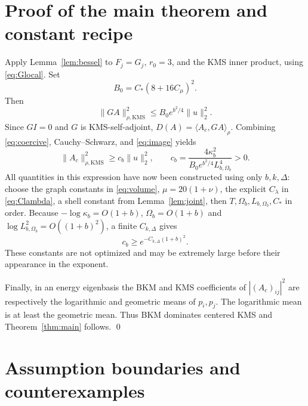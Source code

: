 \documentclass[11pt]{article}
\theoremstyle{remark}\newtheorem{remark}[theorem]{Remark}
\newcommand{\ip}[2]{\langle #1,#2\rangle_\rho}
\newcommand{\kn}[1]{\|#1\|_{\rho,\mathrm{KMS}}}
\begin{document}
\section{Proof of the main theorem and constant recipe}\label{sec:constants}
Apply Lemma~\ref{lem:bessel} to $F_j=G_j$, $r_0=3$, and the KMS inner product, using \eqref{eq:Glocal}. Set
\[
 B_0=C_*(8+16C_\mu)^2.
\]
Then
\begin{equation}\label{eq:image}
 \kn{GA}^2\le B_0e^{b^2/4}\|u\|_2^2.
\end{equation}
Since $GI=0$ and $G$ is KMS-self-adjoint, $D(A)=\ip{A_c}{GA}$. Combining \eqref{eq:coercive}, Cauchy--Schwarz, and \eqref{eq:image} yields
\begin{equation}\label{eq:explicitc}
 \kn{A_c}^2\ge c_b\|u\|_2^2,
 \qquad
 c_b=\frac{4\kappa_b^2}
 {B_0e^{b^2/4}L_{b,\Omega_b}^4}>0.
\end{equation}
All quantities in this expression have now been constructed using only $b,k,\Delta$: choose the graph constants in \eqref{eq:volume}, $\mu=20(1+\nu)$, the explicit $C_\lambda$ in \eqref{eq:Clambda}, a shell constant from Lemma~\ref{lem:joint}, then $T,\Omega_b,L_{b,\Omega_b},C_*$ in order. Because $-\log\kappa_b=O(1+b)$, $\Omega_b=O(1+b)$ and $\log L_{b,\Omega_b}^2=O((1+b)^2)$, a finite $C_{k,\Delta}$ gives
\[
 c_b\ge e^{-C_{k,\Delta}(1+b)^2}.
\]
These constants are not optimized and may be extremely large before their appearance in the exponent.

Finally, in an energy eigenbasis the BKM and KMS coefficients of $|(A_c)_{ij}|^2$ are respectively the logarithmic and geometric means of $p_i,p_j$. The logarithmic mean is at least the geometric mean. Thus BKM dominates centered KMS and Theorem~\ref{thm:main} follows. \qed

\section{Assumption boundaries and counterexamples}
\end{document}
